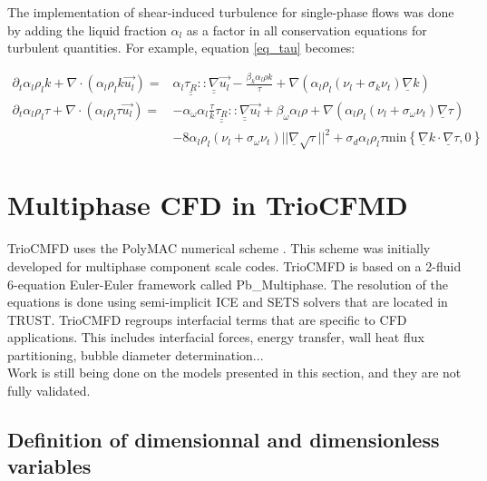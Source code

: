The implementation of shear-induced turbulence for single-phase flows was done by adding the liquid fraction $\alpha_l$ as a factor in all conservation equations for turbulent quantities. For example, equation \ref{eq_tau} becomes:

\begin{equation}
\begin{split}
	\partial_t { \alpha_l } \rho_l k + \nabla \cdot ({ \alpha_l } \rho_l k \vec{u_l}) 
	= & { \alpha_l } \underline{\underline{\tau_R}}::\underline{\underline{\nabla}}\vec{u_l} 
	- \frac{\beta_{k}{ \alpha_l }\rho k}{\tau}
	+ \nabla( { \alpha_l } \rho_l(\nu_l + \sigma_k \nu_t) \underline{\nabla} k)
	\\
	\partial_t { \alpha_l } \rho_l \tau + \nabla \cdot ({ \alpha_l } \rho_l \tau \vec{u_l}) 
	= &	- \alpha_{\omega} { \alpha_l } \frac{\tau}{k}\underline{\underline{\tau_R}}::\underline{\underline{\nabla}}\vec{u_l}
	+ \beta_{\omega}{ \alpha_l }\rho
	+\nabla( { \alpha_l } \rho_l(\nu_l + \sigma_{\omega} \nu_t) \underline{\nabla} \tau) \\
	& - 8 { \alpha_l } \rho_l(\nu_l + \sigma_{\omega} \nu_t) ||\underline{\nabla}\sqrt{\tau}||^2
	+ \sigma_d { \alpha_l } \rho_l \tau \text{min}\left\{\underline{\nabla}k \cdot \underline{\nabla} \tau, 0\right\}
\end{split}
\end{equation}

\section{Multiphase CFD in TrioCFMD}

TrioCMFD uses the PolyMAC numerical scheme \cite{Gerschenfeld_PolyMAC2018, Gerschenfeld_PolyMAC2022}. This scheme was initially developed for multiphase component scale codes. TrioCMFD is based on a 2-fluid 6-equation Euler-Euler framework called Pb\_Multiphase. The resolution of the equations is done using semi-implicit ICE and SETS solvers that are located in TRUST. TrioCMFD regroups interfacial terms that are specific to CFD applications. This includes interfacial forces, energy transfer, wall heat flux partitioning, bubble diameter determination... \\

Work is still being done on the models presented in this section, and they are not fully validated.

\subsection{Definition of dimensionnal and dimensionless variables}

